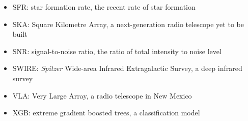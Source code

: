 \begin{itemize}
    \item SFR: star formation rate, the recent rate of star formation
    \item SKA: Square Kilometre Array, a next-generation radio telescope yet to be built
    \item SNR: signal-to-noise ratio, the ratio of total intensity to noise level
    \item SWIRE: \emph{Spitzer} Wide-area Infrared Extragalactic Survey, a deep infrared survey
    \item VLA: Very Large Array, a radio telescope in New Mexico
    \item XGB: extreme gradient boosted trees, a classification model
\end{itemize}